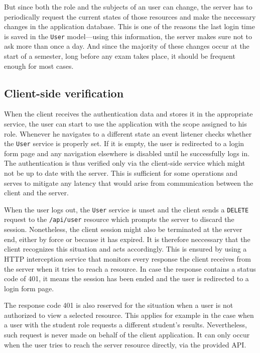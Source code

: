 \documentclass[thesis=M,english,hidelinks]{FITthesis}[2012/10/20]
\newcommand{\code}{\texttt}
\begin{document}
But since both the role and the subjects of an user can change, the server has to periodically request the current states of those resources and make the neccessary changes in the application database. This is one of the reasons the last login time is saved in the \code{User} model---using this information, the server makes sure not to ask more than once a day. And since the majority of these changes occur at the start of a semester, long before any exam takes place, it should be frequent enough for most cases.

\subsection{Client-side verification}

When the client receives the authentication data and stores it in the appropriate service, the user can start to use the application with the scope assigned to his role. Whenever he navigates to a different state an event listener checks whether the \code{User} service is properly set. If it is empty, the user is redirected to a login form page and any navigation elsewhere is disabled until he successfully logs in. The authentication is thus verified only via the client-side service which might not be up to date with the server. This is sufficient for some operations and serves to mitigate any latency that would arise from communication between the client and the server.

When the user logs out, the \code{User} service is unset and the client sends a \code{DELETE} request to the \code{/api/user} resource which prompts the server to discard the session. Nonetheless, the client session might also be terminated at the server end, either by force or because it has expired. It is therefore neccessary that the client recognizes this situation and acts accordingly. This is ensured by using a HTTP interception service that monitors every response the client receives from the server when it tries to reach a resource. In case the response contains a status code of 401, it means the session has been ended and the user is redirected to a login form page.

The response code 401 is also reserved for the situation when a user is not authorized to view a selected resource. This applies for example in the case when a user with the student role requests a different student's results. Nevertheless, such request is never made on behalf of the client application. It can only occur when the user tries to reach the server resource directly, via the provided API.
\end{document}

